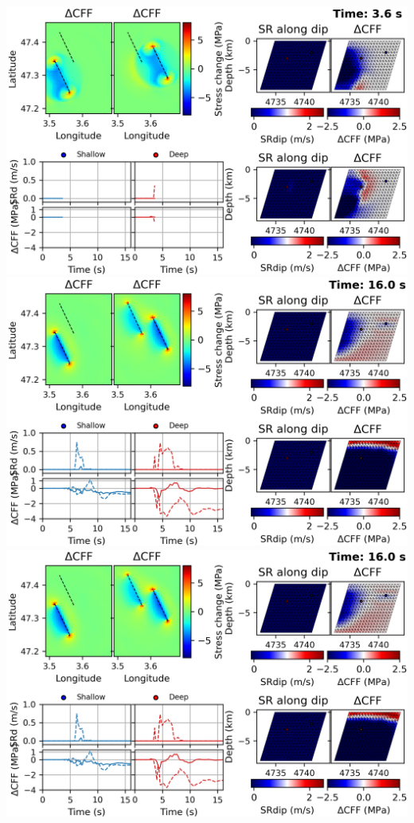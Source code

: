 \begin{poster}
{\begin{minipage}{0.69\linewidth}
  \vskip 0.2cm
 \includegraphics[width=0.94\linewidth]{images/horizontal_delta_00018_nofix.png}
\includegraphics[width=0.94\linewidth]{images/horizontal_delta_00080_nofix.png} 
\includegraphics[width=0.94\linewidth]{images/horizontal_delta_00080_nofix.png} 
\end{minipage} \vrule width 0.05cm
\begin{minipage}{0.29\linewidth}


\end{minipage}}
\end{poster}

